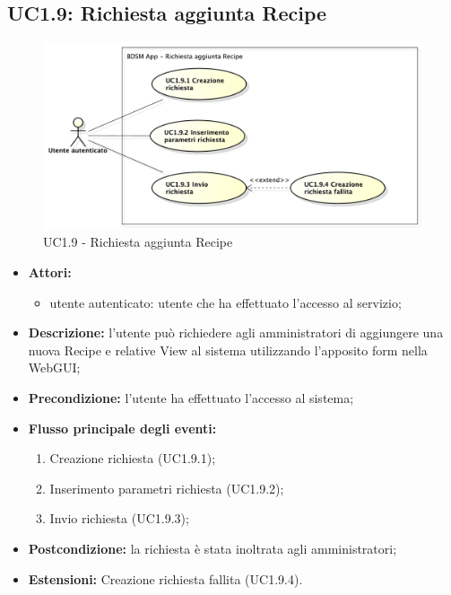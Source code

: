 \pagebreak

\subsection{UC1.9: Richiesta aggiunta Recipe}
\begin{figure}[!htbp]
	\centering
	\centerline{\includegraphics[scale=0.50]{./images/UC1_9.pdf}}
	\caption{UC1.9 - Richiesta aggiunta Recipe}
\end{figure}

\begin{itemize}
	\item \textbf{Attori:}
	\begin{itemize}
		\item utente autenticato: utente che ha effettuato l'accesso al servizio;
	\end{itemize}
	\item \textbf{Descrizione:} l'utente può richiedere agli amministratori di aggiungere una nuova Recipe e relative View al sistema utilizzando l'apposito form nella WebGUI;
	\item \textbf{Precondizione:} l'utente ha effettuato l'accesso al sistema;
	\item \textbf{Flusso principale degli eventi:}
	\begin{enumerate}
		\item Creazione richiesta (UC1.9.1);
		\item Inserimento parametri richiesta (UC1.9.2);
		\item Invio richiesta (UC1.9.3);
	\end{enumerate}
	\item \textbf{Postcondizione:} la richiesta è stata inoltrata agli amministratori;
	\item \textbf{Estensioni:} Creazione richiesta fallita (UC1.9.4).
\end{itemize}


